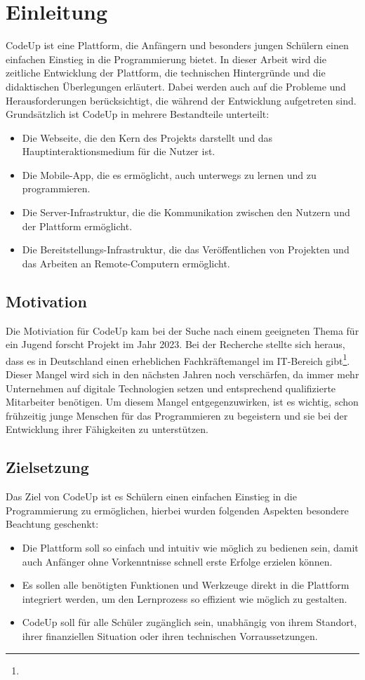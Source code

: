 \documentclass[main.tex]{subfiles}
\begin{document}
\chapter{Einleitung}\label{ch:intro}

CodeUp ist eine Plattform, die Anfängern und besonders jungen Schülern einen einfachen Einstieg in die Programmierung bietet.
In dieser Arbeit wird die zeitliche Entwicklung der Plattform, die technischen Hintergründe und die didaktischen Überlegungen erläutert.
Dabei werden auch auf die Probleme und Herausforderungen berücksichtigt, die während der Entwicklung aufgetreten sind.
Grundsätzlich ist CodeUp in mehrere Bestandteile unterteilt:
\begin{itemize}
    \item Die Webseite, die den Kern des Projekts darstellt und das Hauptinteraktionsmedium für die Nutzer ist.
    \item Die Mobile-App, die es ermöglicht, auch unterwegs zu lernen und zu programmieren.
    \item Die Server-Infrastruktur, die die Kommunikation zwischen den Nutzern und der Plattform ermöglicht.
    \item Die Bereitstellungs-Infrastruktur, die das Veröffentlichen von Projekten und das Arbeiten an Remote-Computern ermöglicht.
\end{itemize}

\section{Motivation}
Die Motiviation für CodeUp kam bei der Suche nach einem geeigneten Thema für ein Jugend forscht Projekt im Jahr 2023.
Bei der Recherche stellte sich heraus, dass es in Deutschland einen erheblichen Fachkräftemangel im IT-Bereich gibt\footnote{}.
Dieser Mangel wird sich in den nächsten Jahren noch verschärfen, da immer mehr Unternehmen auf digitale Technologien setzen und entsprechend qualifizierte Mitarbeiter benötigen.
Um diesem Mangel entgegenzuwirken, ist es wichtig, schon frühzeitig junge Menschen für das Programmieren zu begeistern und sie bei der Entwicklung ihrer Fähigkeiten zu unterstützen.

\section{Zielsetzung}
Das Ziel von CodeUp ist es Schülern einen einfachen Einstieg in die Programmierung zu ermöglichen, hierbei wurden folgenden Aspekten
besondere Beachtung geschenkt:
\begin{itemize}
    \item Die Plattform soll so einfach und intuitiv wie möglich zu bedienen sein, damit auch Anfänger ohne Vorkenntnisse schnell erste Erfolge erzielen können.
    \item Es sollen alle benötigten Funktionen und Werkzeuge direkt in die Plattform integriert werden, um den Lernprozess so effizient wie möglich zu gestalten.
    \item CodeUp soll für alle Schüler zugänglich sein, unabhängig von ihrem Standort, ihrer finanziellen Situation oder ihren technischen Vorraussetzungen.
\end{itemize}
\end{document}
